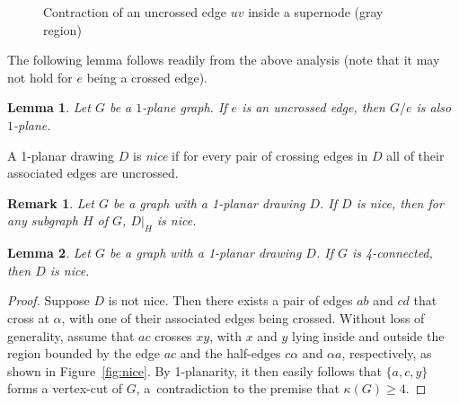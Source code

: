 \documentclass[12pt,a4paper]{article}
\newtheorem{lem}{Lemma}[section]
\newtheorem{remark}{Remark}[section]
\begin{document}
\begin{figure}[H]


\caption{Contraction of an uncrossed edge $uv$ inside a supernode (gray region)}
\label{Contraction}
\end{figure}







The following lemma follows readily from the above analysis (note that it may not hold for $e$ being a crossed edge).
\begin{lem}\label{keep1_planar}
Let $G$ be a $1$-plane graph. If $e$ is an uncrossed edge, then  $G / e$ is also $1$-plane.
\end{lem}



A 1-planar drawing 
$D$ is \emph{nice} if for every pair of crossing edges in  $D$ all of their associated edges are uncrossed.


\begin{remark}\label{remark:kite}
Let $G$ be a graph with a 1-planar drawing $D$.  If $D$ is nice, then 
for any subgraph $H$  of $G$, $D|_H$ is nice. 
\end{remark}


\begin{lem}\label{lem:4_connected_kite}
Let $G$ be a graph with a 1-planar drawing $D$.  If $G$ is 4-connected, then $D$ is nice.
\end{lem}
\begin{proof}
Suppose $D$ is not nice. Then there exists a pair of edges $ab$ and $cd$ that cross at $\alpha$, with one of their associated edges being crossed.  Without loss of generality, assume that $ac$ crosses $xy$, with $x$ and $y$ lying inside and outside the region bounded by the edge $ac$ and the half-edges $c\alpha$ and $\alpha a$, respectively, as shown in Figure~\ref{fig:nice}. By 1-planarity, it then easily follows that $\{a, c, y\}$ forms a vertex-cut of $G$, a contradiction to the premise that  $\kappa(G)\ge 4$.
\end{proof}
\end{document}

